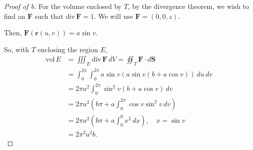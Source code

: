\documentclass[../hw10]{subfiles}
\begin{document}
\begin{proof}[Proof of b]
	For the volume enclosed by $T$, by the divergence theorem, we wish to find an  $\mathbf{F}$ such that $\text{div}\,\mathbf{F} = 1$.
	We will use $\mathbf{F} = (0,0,z)$.

	Then, $\mathbf{F}(\mathbf{r}(u,v)) = a\sin{v}$.

	So, with $T$ enclosing the region  $E$,
	\begin{align*}
		\text{vol}\,E & = \iiint_E \text{div}\,\mathbf{F}\,dV = \oiint_T \mathbf{F}\cdot d\mathbf{S} \\
		              & = \int_{0}^{2\pi} \int_{0}^{2\pi} a\sin{v}(a\sin{v}(b+a\cos{v}))\,du\,dv     \\
		              & = 2\pi a^2 \int_{0}^{2\pi} \sin^2{v}(b+a\cos{v})\,dv                         \\
		              & = 2\pi a^2 (b\pi + a \int_{0}^{2\pi}\cos{v}\sin^2{v}\,dv)                    \\
		              & = 2\pi a^2 (b\pi + a \int_0^0 x^2\,dx),\quad x = \sin{v}                     \\
		              & = 2\pi^2 a^2 b
		.\end{align*}

\end{proof}
\end{document}
